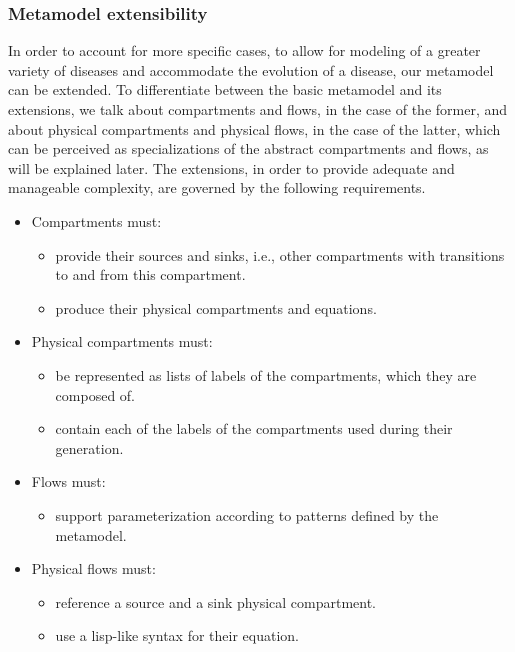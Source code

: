 \subsubsection{Metamodel extensibility}

In order to account for more specific cases, to allow for modeling of a greater variety of diseases and accommodate the evolution of a disease, our metamodel can be extended. To differentiate between the basic metamodel and its extensions, we talk about compartments and flows, in the case of the former, and about physical compartments and physical flows, in the case of the latter, which can be perceived as specializations of the abstract compartments and flows, as will be explained later. The extensions, in order to provide adequate and manageable complexity, are governed by the following requirements.
\begin{itemize}
    \item Compartments must:
    \begin{itemize}
        \item provide their sources and sinks, i.e., other compartments with transitions to and from this compartment.
        \item produce their physical compartments and equations.
    \end{itemize}
    \item Physical compartments must:
    \begin{itemize}
        \item be represented as lists of labels of the compartments, which they are composed of.
        \item contain each of the labels of the compartments used during their generation.
    \end{itemize}
    \item Flows must:
    \begin{itemize}
        \item support parameterization according to patterns defined by the metamodel.
    \end{itemize}
    \item Physical flows must:
    \begin{itemize}
        \item reference a source and a sink physical compartment.
        \item use a lisp-like syntax for their equation.
    \end{itemize}
\end{itemize}



